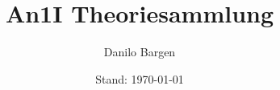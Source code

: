 


\subject{Analysis 1 für Informatiker}
\title{An1I Theoriesammlung}
\author{Danilo Bargen}
\date{Stand: \today}














